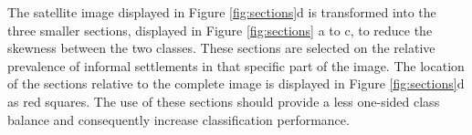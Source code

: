 The satellite image displayed in Figure \ref{fig:sections}d is transformed into the three smaller sections, displayed in Figure \ref{fig:sections} a to c, to reduce the skewness between the two classes. These sections are selected on the relative prevalence of informal settlements in that specific part of the image. The location of the sections relative to the complete image is displayed in Figure \ref{fig:sections}d as red squares. The use of these sections should provide a less one-sided class balance and consequently increase classification performance. 



